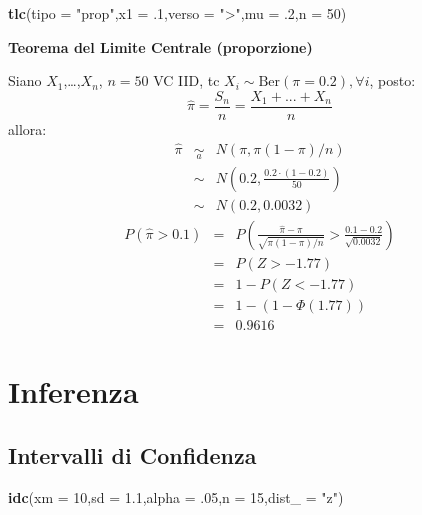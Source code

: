 \documentclass[
  11pt,
]{book}
\newenvironment{Shaded}{\begin{snugshade}}{\end{snugshade}}
\newcommand{\AttributeTok}[1]{\textcolor[rgb]{0.13,0.29,0.53}{#1}}
\newcommand{\DecValTok}[1]{\textcolor[rgb]{0.00,0.00,0.81}{#1}}
\newcommand{\FloatTok}[1]{\textcolor[rgb]{0.00,0.00,0.81}{#1}}
\newcommand{\FunctionTok}[1]{\textcolor[rgb]{0.13,0.29,0.53}{\textbf{#1}}}
\newcommand{\NormalTok}[1]{#1}
\newcommand{\StringTok}[1]{\textcolor[rgb]{0.31,0.60,0.02}{#1}}
\theoremstyle{mytheoremstyle}
\theoremstyle{mydefstyle}
\begin{document}
\begin{Shaded}
\begin{Highlighting}[]
\FunctionTok{tlc}\NormalTok{(}\AttributeTok{tipo =} \StringTok{"prop"}\NormalTok{,}\AttributeTok{x1 =}\NormalTok{ .}\DecValTok{1}\NormalTok{,}\AttributeTok{verso =} \StringTok{"\textgreater{}"}\NormalTok{,}\AttributeTok{mu =}\NormalTok{ .}\DecValTok{2}\NormalTok{,}\AttributeTok{n =} \DecValTok{50}\NormalTok{)}
\end{Highlighting}
\end{Shaded}

\textbf{Teorema del Limite Centrale (proporzione)}

Siano \(X_1\),\ldots,\(X_n\), \(n=50\) VC IID, tc \(X_i\sim\text{Ber}(\pi=0.2)\)\(,\forall i\), posto:
\[
      \hat\pi=\frac{S_n}n = \frac{X_1 + ... + X_n}n
      \]
allora:\begin{eqnarray*}
  \hat\pi & \mathop{\sim}\limits_{a}& N(\pi,\pi(1-\pi)/n) \\
  &\sim & N\left(0.2,\frac{0.2\cdot(1-0.2)}{50}\right) \\
     &\sim & N(0.2,0.0032) 
  \end{eqnarray*}\begin{eqnarray*}
      P( \hat\pi   >   0.1 ) 
        &=& P\left(  \frac { \hat\pi  -  \pi }{ \sqrt{\pi(1-\pi)/n} }  >  \frac { 0.1  -  0.2 }{\sqrt{ 0.0032 }} \right)  \\
                 &=& P\left(  Z   >   -1.77 \right) \\    &=& 1-P(Z< -1.77 )\\ 
                 &=&  1-(1-\Phi( 1.77 )) \\ &=&  0.9616 
      \end{eqnarray*}

\section{Inferenza}\label{inferenza}

\subsection{Intervalli di Confidenza}\label{intervalli-di-confidenza}

\begin{Shaded}
\begin{Highlighting}[]
\FunctionTok{idc}\NormalTok{(}\AttributeTok{xm =} \DecValTok{10}\NormalTok{,}\AttributeTok{sd =} \FloatTok{1.1}\NormalTok{,}\AttributeTok{alpha =}\NormalTok{ .}\DecValTok{05}\NormalTok{,}\AttributeTok{n =} \DecValTok{15}\NormalTok{,}\AttributeTok{dist\_ =} \StringTok{"z"}\NormalTok{)}
\end{Highlighting}
\end{Shaded}
\end{document}
